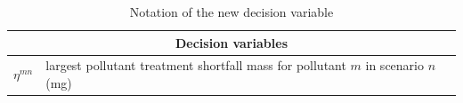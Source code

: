 \documentclass[preprint,12pt,authoryear]{elsarticle}
\begin{document}
\begin{table}[!htb]
	\setlength{\extrarowheight}{1.5mm}
	\caption{Notation of the new decision variable}
	\begin{tabular}{|p{1.5cm} p{16cm}|}
		\hline
		\multicolumn{2}{|c|}{Decision variables}\\
		\hline	
		$\eta^{mn}$ & largest pollutant treatment shortfall mass for pollutant $m$ in scenario $n$ (mg)\\
		\hline	
	\end{tabular}

	\label{table:modelparameterss2}
\end{table}
\end{document}
